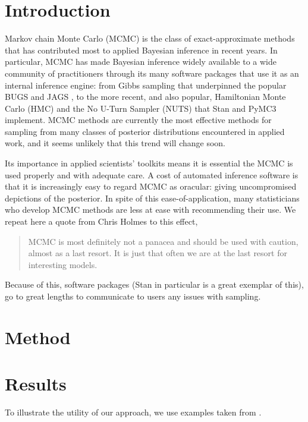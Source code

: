 \documentclass{article}
\begin{document}
\section{Introduction}
Markov chain Monte Carlo (MCMC) is the class of exact-approximate methods that has contributed most to applied Bayesian inference in recent years. In particular, MCMC has made Bayesian inference widely available to a wide community of practitioners through its many software packages that use it as an internal inference engine: from Gibbs sampling \cite{geman1984stochastic} that underpinned the popular BUGS \cite{lunn2000winbugs} and JAGS \cite{plummer2003jags}, to the more recent, and also popular, Hamiltonian Monte Carlo (HMC) \cite{neal2011mcmc} and the No U-Turn Sampler (NUTS) \cite{hoffman2014no} that Stan \cite{carpenter2017stan} and PyMC3 \cite{salvatier2016probabilistic} implement. MCMC methods are currently the most effective methods for sampling from many classes of posterior distributions encountered in applied work, and it seems unlikely that this trend will change soon.

Its importance in applied scientists' toolkits means it is essential the MCMC is used properly and with adequate care. A cost of automated inference software is that it is increasingly easy to regard MCMC as oracular: giving uncompromised depictions of the posterior. In spite of this ease-of-application, many statisticians who develop MCMC methods are less at ease with recommending their use. We repeat here a quote from Chris Holmes to this effect,

\begin{quote}
	MCMC is most definitely not a panacea and should be used with caution, almost as a last resort. It is just that often we are at the last resort for interesting models.
\end{quote}

Because of this, software packages (Stan in particular \cite{carpenter2017stan} is a great exemplar of this), go to great lengths to communicate to users any issues with sampling.

\section{Method}

\section{Results}
To illustrate the utility of our approach, we use examples taken from \cite{vehtari2019rank}.
\end{document}
